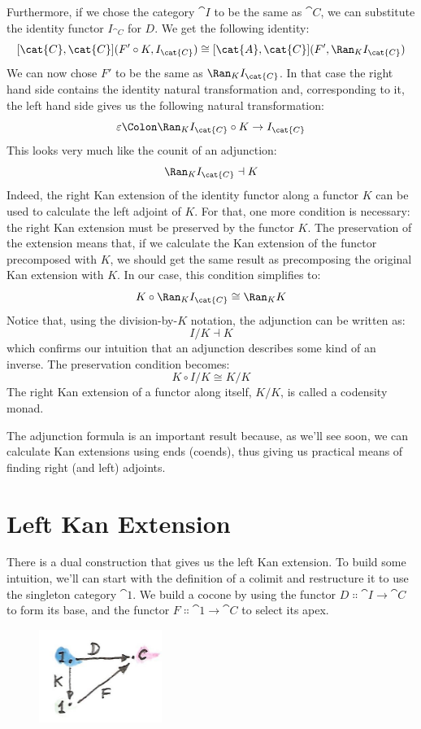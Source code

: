 \noindent
Furthermore, if we chose the category $\cat{I}$ to be the same as
$\cat{C}$, we can substitute the identity functor $I_{\cat{C}}$ for
$D$. We get the following identity:
\[[\cat{C}, \cat{C}](F' \circ K, I_{\cat{C}}) \cong [\cat{A}, \cat{C}](F', \Ran_{K}I_{\cat{C}})\]
We can now chose $F'$ to be the same as $\Ran_{K}I_{\cat{C}}$. In
that case the right hand side contains the identity natural
transformation and, corresponding to it, the left hand side gives us the
following natural transformation:
\[\varepsilon \Colon \Ran_{K}I_{\cat{C}} \circ K \to I_{\cat{C}}\]
This looks very much like the counit of an adjunction:
\[\Ran_{K}I_{\cat{C}} \dashv K\]
Indeed, the right Kan extension of the identity functor along a functor
$K$ can be used to calculate the left adjoint of $K$. For
that, one more condition is necessary: the right Kan extension must be
preserved by the functor $K$. The preservation of the extension
means that, if we calculate the Kan extension of the functor precomposed
with $K$, we should get the same result as precomposing the
original Kan extension with $K$. In our case, this condition
simplifies to:
\[K \circ \Ran_{K}I_{\cat{C}} \cong \Ran_{K}K\]
Notice that, using the division-by-$K$ notation, the adjunction can be
written as:
\[I/K \dashv K\]
which confirms our intuition that an adjunction describes some kind of
an inverse. The preservation condition becomes:
\[K \circ I/K \cong K/K\]
The right Kan extension of a functor along itself, $K/K$, is
called a codensity monad.

The adjunction formula is an important result because, as we'll see
soon, we can calculate Kan extensions using ends (coends), thus giving
us practical means of finding right (and left) adjoints.

\section{Left Kan Extension}

There is a dual construction that gives us the left Kan extension. To
build some intuition, we'll can start with the definition of a colimit
and restructure it to use the singleton category $\cat{1}$. We build a
cocone by using the functor $D \Colon \cat{I} \to \cat{C}$ to form its
base, and the functor $F \Colon \cat{1} \to \cat{C}$ to select its apex.

\begin{figure}[H]
\centering
\includegraphics[width=40mm]{images/kan81.jpg}
\end{figure}

